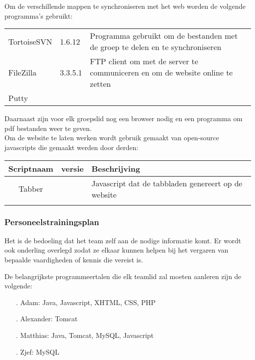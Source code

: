 \documentclass{article}
\begin{document}
Om de verschillende mappen te synchroniseren met het web worden de volgende programma's gebruikt:
\begin{center}
\begin{tabular}{|p{4cm}|p{1.5cm}|p{6cm}|}
\hline
TortoiseSVN & 1.6.12 & Programma gebruikt om de bestanden met de groep te delen en te synchroniseren \\
\hdashline[1pt/5pt] 
FileZilla & 3.3.5.1 & FTP client om met de server te communiceren en om de website online te zetten \\
\hdashline[1pt/5pt] 
Putty & & \\
\hline
\end{tabular}
\end{center}

Daarnaast zijn voor elk groepslid nog een browser nodig en een programma om pdf bestanden weer te geven.\\
Om de website te laten werken wordt gebruik gemaakt van open-source javascripts die gemaakt werden door derden:

\begin{center}
\begin{tabular}{|c|c|p{9cm}|}
\hline
Scriptnaam & versie & Beschrijving \\
\hline
\hline
Tabber & & Javascript dat de tabbladen genereert op de website \\
 & & \\
\hline
\end{tabular}
\end{center}

\subsubsection{Personeelstrainingsplan}

Het is de bedoeling dat het team zelf aan de nodige informatie komt. Er wordt ook onderling overlegd zodat ze elkaar kunnen helpen bij het vergaren van bepaalde vaardigheden of kennis die vereist is.

De belangrijkste programmeertalen die elk teamlid zal moeten aanleren zijn de volgende:

\begin{itemize}
\item[.] Adam: Java, Javascript, XHTML, CSS, PHP \\[-5mm]
\item[.] Alexander: Tomcat \\[-5mm]
\item[.] Matthias: Java, Tomcat, MySQL, Javascript \\[-5mm]
\item[.] Zjef: MySQL \\[-5mm]
\end{itemize}
\end{document}
